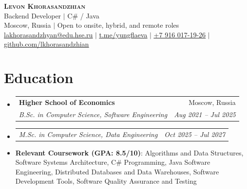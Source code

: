 \documentclass[letterpaper,11pt]{article}
\makeatletter
\newcommand{\resumeItem}[1]{
  \item\small{
    {#1 \vspace{-4pt}}
  }
}
\newcommand{\resumeSubheading}[4]{
  \vspace{-2pt}\item
    \begin{tabular*}{0.97\textwidth}[t]{l@{\extracolsep{\fill}}r}
      \textbf{#1} & #2 \\
      \textit{\small#3} & \textit{\small #4} \\
    \end{tabular*}\vspace{-7pt}
}
\newcommand{\resumeSubSubheading}[2]{
    \item
    \begin{tabular*}{0.97\textwidth}{l@{\extracolsep{\fill}}r}
      \textit{\small#1} & \textit{\small #2} \\
    \end{tabular*}\vspace{-7pt}
}
\newcommand{\resumeSubHeadingListStart}{\begin{itemize}[leftmargin=0.15in, label={}]}
\newcommand{\resumeSubHeadingListEnd}{\end{itemize}}
\makeatother
\begin{document}
\begin{center}
    \textbf{\Huge \scshape Levon Khorasandzhian} \\ \vspace{2pt}
    \small Backend Developer $|$ C\# / Java \\ \vspace{1pt}
    \small Moscow, Russia $|$ Open to onsite, hybrid, and remote roles \\ \vspace{1pt}
    \href{mailto:lakhorasandzhyan@edu.hse.ru}{\underline{lakhorasandzhyan@edu.hse.ru}} $|$ 
    \href{https://t.me/yungflaeva}{\underline{t.me/yungflaeva}} $|$
    \href{tel:+79160171926}{\underline{+7 916 017-19-26}} $|$
    \href{https://github.com/lkhorasandzhian}{\underline{github.com/lkhorasandzhian}}
\end{center}

\section{Education}
  \resumeSubHeadingListStart
    \resumeSubheading
      {Higher School of Economics}{Moscow, Russia}
      {B.Sc. in Computer Science, Software Engineering}{Aug 2021 -- Jul 2025}
    \resumeSubSubheading
      {M.Sc. in Computer Science, Data Engineering}{Oct 2025 -- Jul 2027}
    \resumeItem{
        \textbf{Relevant Coursework (GPA: 8.5/10)}: Algorithms and Data Structures, Software Systems Architecture, C\# Programming, Java Software Engineering, Distributed Databases and Data Warehouses, Software Development Tools, Software Quality Assurance and Testing
    }

  \resumeSubHeadingListEnd

\end{document}
